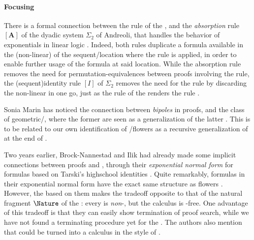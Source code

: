 \begin{scope}
\paragraph{Focusing}

There is a formal connection between the  rule of the , and the \emph{absorption} rule $[\mathbf{A}]$ of the dyadic system
$\Sigma_2$ of Andreoli, that handles the  behavior of exponentials
in linear logic . Indeed, both rules duplicate a formula
available in the (non-linear)  of the sequent/location where the
rule is applied, in order to enable further usage of the formula at said
location. While the absorption rule removes the need for
permutation-equivalences between proofs involving the \emph{}
rule, the \kl(sequent){identity rule} $[I]$ of $\Sigma_2$ removes the need for
the \emph{} rule by discarding the non-linear  in one
go, just as the  rule of the  renders the 
rule .

Sonia Marin has noticed the connection between \emph{bipoles} in 
proofs, and the class of geometric/, where the former are seen
as a generalization of the latter . This is to be
related to our own identification of /flowers as a recursive
generalization of  at the end of .

\AP
Two years earlier, Brock-Nannestad and Ilik had already made some implicit
connections between  proofs and , through their
\emph{exponential normal form} for  formulas based on Tarski's
highschool identities . Quite
remarkably,  formulas in their exponential normal form have the exact
same structure as flowers
\cite[Definition~4.2]{brock-nannestad_intuitionistic_2019}. However, the   based on them makes the tradeoff opposite to that of the
natural fragment $\Nature$ of the : every  is
\emph{non}-, but the calculus is -free. One advantage of
this tradeoff is that they can easily show termination of proof search, while we
have not found a terminating procedure yet for the . The authors
also mention that  could be turned into a  calculus in the
style of .


\end{scope}
